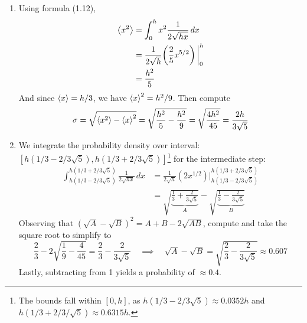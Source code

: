 \documentclass[a4paper]{article}
\begin{document}

\begin{enumerate}[label=(\alph*)]
	\item Using formula (1.12),
	\begin{align*}
		\braket{x^{2}} & = \int^{h}_{0} x^{2}\frac{1}{2 \sqrt{hx}} \, dx \\
		 & = \frac{1}{2 \sqrt{h}}\!\left( \frac{2}{5}x^{5/2} \right)\bigg|^{h}_{0} \\
		 & = \frac{h^{2}}{5}
	\end{align*}
	And since \( \braket{x} = h / 3 \), we have \( \braket{x}^{2} = h^{2} / 9 \). Then compute
	\[
		\sigma = \sqrt{\braket{x^{2}} - \braket{x}^{2}} = \sqrt{\frac{h^{2}}{5} - \frac{h^{2}}{9}} = \sqrt{\frac{4h^{2}}{45}} = \frac{2h}{3 \sqrt{5}}
	\]
\item We integrate the probability density over interval: \( \!\left[ h \!\left( 1/3 - 2 / 3 \sqrt{5} \right), h \!\left( 1/3 + 2 / 3 \sqrt{5} \right) \right] \)\footnote{The bounds fall within \( \!\left[ 0,h \right] \), as \( h \!\left( 1/3 - 2/3 \sqrt{5} \right) \approx 0.0352h \) and \( h \!\left( 1/3 + 2 / 3 /\sqrt{5} \right) \approx 0.6315h \).} for the intermediate step:
	\begin{align*}
		\int^{h \!\left( 1/3 + 2 / 3 \sqrt{5} \right)}_{h \!\left( 1/3 - 2 / 3 \sqrt{5} \right)} \frac{1}{2 \sqrt{hx}} \, dx & = \frac{1}{2 \sqrt{h}}\!\left( 2x^{1/2} \right)\bigg|^{h \!\left( 1/3 + 2 / 3 \sqrt{5} \right)}_{h \!\left( 1/3 - 2 / 3 \sqrt{5} \right)} \\
																     & = \sqrt{\underbrace{\frac{1}{3} + \frac{2}{3 \sqrt{5}}}_{A}} - \sqrt{\underbrace{\frac{1}{3} - \frac{2}{3 \sqrt{5}}}_{B}}
	\end{align*}
	Observing that \( \!\left( \sqrt{A} - \sqrt{B} \right)^{2} = A + B - 2 \sqrt{AB} \), compute and take the square root to simplify to
	\[
		\frac{2}{3} - 2 \sqrt{\frac{1}{9} - \frac{4}{45}} = \frac{2}{3} - \frac{2}{3 \sqrt{5}} \quad \implies \quad \sqrt{A} - \sqrt{B} = \sqrt{\frac{2}{3} - \frac{2}{3 \sqrt{5}}} \approx 0.607
	\]
	Lastly, subtracting from 1 yields a probability of \( \approx 0.4 \).
\end{enumerate}
\end{document}
